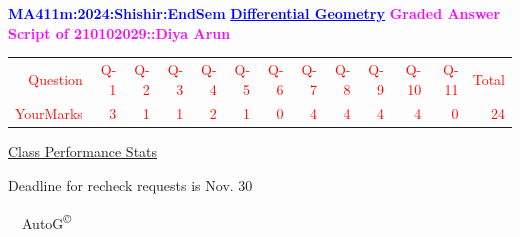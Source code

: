 \documentclass{article}                              %
\begin{document}
%
\vspace*{1in}

\begin{center}
	\textbf{\textcolor{blue}{\LARGE MA411m:2024:Shishir:EndSem}}
	\vskip 1cm
	\textbf{\textcolor{blue}{\underline{\Large Differential Geometry}}}
	\vskip 1cm
	\textbf{\textcolor{magenta}{\LARGE Graded Answer Script of 210102029::Diya Arun}}
\end{center}


\begin{center}
	\Huge 
	\textcolor{red}{
	\begin{tabular}{*{13}{r}}
		Question&Q-1& Q-2& Q-3& Q-4& Q-5& Q-6& Q-7& Q-8& Q-9& Q-10& Q-11&Total  \\
        	YourMarks&3&1&1&2&1&0&4&4&4&4&0&24
	\end{tabular}
	}
        \vskip 2cm
	\large
	\underline{Class Performance Stats}
	\DTLsetseparator{;}
	\begin{table}[htbp]
		\centering
	\end{table}
	\vskip 1cm
	Deadline for recheck requests is Nov. 30
\end{center}
\ \vfill \ \hfill \small AutoG\textsuperscript{\copyright}
\newpage
%
\end{document}
